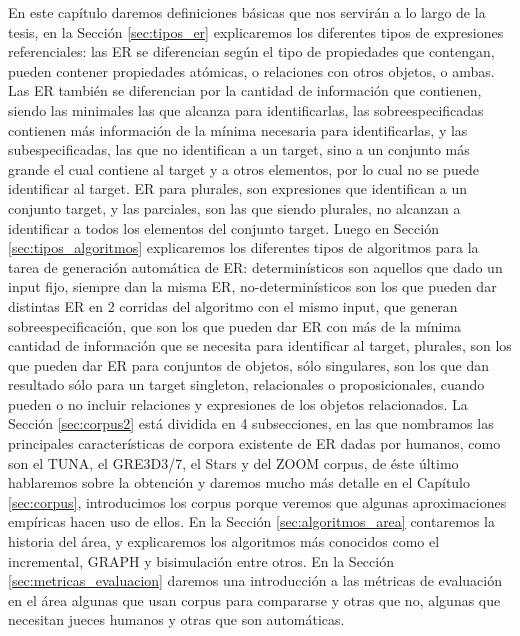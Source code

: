 En este cap\'itulo daremos definiciones b\'asicas que nos servir\'an a lo largo de la tesis, en la Secci\'on \ref{sec:tipos_er} explicaremos los diferentes tipos de expresiones referenciales: las ER se diferencian seg\'un el tipo de propiedades que contengan, pueden contener propiedades at\'omicas, o relaciones con otros objetos, o ambas. Las ER tambi\'en se diferencian por la cantidad de informaci\'on que contienen, siendo las minimales las que alcanza para identificarlas, las sobreespecificadas contienen m\'as informaci\'on de la m\'inima necesaria para identificarlas, y las subespecificadas, las que no identifican a un target, sino a un conjunto m\'as grande el cual contiene al target y a otros elementos, por lo cual no se puede identificar al target. ER para plurales, son expresiones que identifican a un conjunto target, y las parciales, son las que siendo plurales, no alcanzan a identificar a todos los elementos del conjunto target. Luego en Secci\'on \ref{sec:tipos_algoritmos} explicaremos los diferentes tipos de algoritmos para la tarea de generaci\'on autom\'atica de ER: determin\'isticos son aquellos que dado un input fijo, siempre dan la misma ER, no-determin\'isticos son los que pueden dar distintas ER en 2 corridas del algoritmo con el mismo input, que generan sobreespecificaci\'on, que son los que pueden dar ER con m\'as de la m\'inima cantidad de informaci\'on que se necesita para identificar al target, plurales, son los que pueden dar ER para conjuntos de objetos, s\'olo singulares, son los que dan resultado s\'olo para un target singleton, relacionales o proposicionales, cuando pueden o no incluir relaciones y expresiones de los objetos relacionados. La Secci\'on \ref{sec:corpus2} est\'a dividida en 4 subsecciones, en las que nombramos las principales caracter\'isticas de corpora existente de ER dadas por humanos, como son el TUNA, el GRE3D3/7, el Stars y del ZOOM corpus, de \'este \'ultimo hablaremos sobre la obtenci\'on y daremos mucho m\'as detalle en el Cap\'itulo \ref{sec:corpus}, introducimos los corpus porque veremos que algunas aproximaciones emp\'iricas hacen uso de ellos. En la Secci\'on \ref{sec:algoritmos_area} contaremos la historia del \'area, y explicaremos los algoritmos m\'as conocidos como el incremental, GRAPH y bisimulaci\'on entre otros. En la Secci\'on \ref{sec:metricas_evaluacion} daremos una introducci\'on a las m\'etricas de evaluaci\'on en el \'area algunas que usan corpus para compararse y otras que no, algunas que necesitan jueces humanos y otras que son autom\'aticas.

